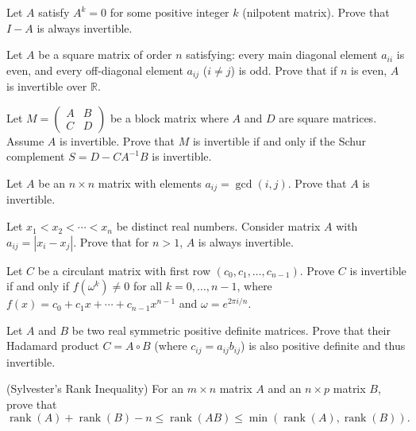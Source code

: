 \documentclass[12pt]{article}
\begin{document}
\begin{problem}
Let $A$ satisfy $A^k=0$ for some positive integer $k$ (nilpotent matrix). Prove that $I-A$ is always invertible.
\end{problem}

\begin{problem}
Let $A$ be a square matrix of order $n$ satisfying: every main diagonal element $a_{ii}$ is even, and every off-diagonal element $a_{ij}$ ($i\ne j$) is odd. Prove that if $n$ is even, $A$ is invertible over $\mathbb{R}$.
\end{problem}

\begin{problem}
Let $M=\begin{pmatrix}A & B\\ C & D\end{pmatrix}$ be a block matrix where $A$ and $D$ are square matrices. Assume $A$ is invertible. Prove that $M$ is invertible if and only if the Schur complement $S=D-CA^{-1}B$ is invertible.
\end{problem}

\begin{problem}
Let $A$ be an $n\times n$ matrix with elements $a_{ij}=\gcd(i,j)$. Prove that $A$ is invertible.
\end{problem}

\begin{problem}
Let $x_1<x_2<\cdots<x_n$ be distinct real numbers. Consider matrix $A$ with $a_{ij}=|x_i-x_j|$. Prove that for $n>1$, $A$ is always invertible.
\end{problem}

\begin{problem}
Let $C$ be a circulant matrix with first row $(c_0,c_1,\dots,c_{n-1})$. Prove $C$ is invertible if and only if $f(\omega^k)\ne 0$ for all $k=0,\dots,n-1$, where $f(x)=c_0+c_1x+\cdots+c_{n-1}x^{n-1}$ and $\omega=e^{2\pi i/n}$.
\end{problem}

\begin{problem}
Let $A$ and $B$ be two real symmetric positive definite matrices. Prove that their Hadamard product $C=A\circ B$ (where $c_{ij}=a_{ij}b_{ij}$) is also positive definite and thus invertible.
\end{problem}

\begin{problem}
(Sylvester's Rank Inequality) For an $m\times n$ matrix $A$ and an $n\times p$ matrix $B$, prove that
\[
\operatorname{rank}(A)+\operatorname{rank}(B)-n \le \operatorname{rank}(AB) \le \min(\operatorname{rank}(A),\operatorname{rank}(B)).
\]
\end{problem}
\end{document}
